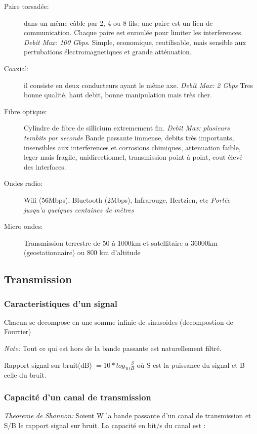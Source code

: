 \documentclass[a4paper, 12pt, french]{article}
\begin{document}
	\begin{description}
		\item[Paire torsadée:] dans un même câble par 2, 4 ou 8 fils; une paire est un lien de communication. Chaque paire est enroulée pour limiter les interferences. \emph{Debit Max: 100 Gbps}. Simple, economique, reutilisable, mais sensible aux pertubations électromagnetiques et grande atténuation.
		\item[Coaxial:] il consiste en deux conducteurs ayant le même axe. \emph{Debit Max: 2 Gbps} Tres bonne qualité, haut debit, bonne manipulation mais très cher.
		\item[Fibre optique:] Cylindre de fibre de sillicium extremement fin. \emph{Debit Max: plusieurs terabits par seconde} Bande passante immense, debits très importants, insensibles aux interferences et corrosions chimiques, attenuation faible, leger mais fragile, unidirectionnel, transmission point à point, cout élevé des interfaces.
		\item[Ondes radio:] Wifi (56Mbps), Bluetooth (2Mbps), Infrarouge, Hertzien, etc \emph{Portée jusqu'a quelques centaines de mètres}
		\item[Micro ondes:] Transmission terrestre de 50 à 1000km et satellitaire a 36000km (geostationnaire) ou 800 km d'altitude
	\end{description}


	\subsection{Transmission}

	\subsubsection{Caracteristiques d'un signal}

	Chacun se decompose en une somme infinie de sinusoides (decompostion de Fourrier)

	\emph{Note:} Tout ce qui est hors de la bande passante est naturellement filtré.  

	Rapport signal sur bruit(dB) $ = 10 * log_{10} \frac{S}{B}$ où S est la puissance du signal et B celle du bruit.

	\subsubsection{Capacité d'un canal de transmission}

	\emph{Theoreme de Shannon:} Soient W la bande passante d'un canal de transmission et S/B le rapport signal sur bruit. La capacité en bit/s du canal est :
\end{document}
